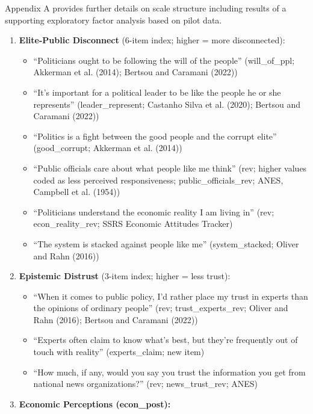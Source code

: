 \documentclass[
  12pt]{article}
\providecommand{\tightlist}{%
  \setlength{\itemsep}{0pt}\setlength{\parskip}{0pt}}
\begin{document}
Appendix A provides further details on scale structure including results
of a supporting exploratory factor analysis based on pilot data.

\begin{enumerate}
\def\labelenumi{\arabic{enumi}.}
\tightlist
\item
  \textbf{Elite-Public Disconnect} (6-item index; higher = more
  disconnected):

  \begin{itemize}
  \tightlist
  \item
    ``Politicians ought to be following the will of the people''
    (will\_of\_ppl; Akkerman et al. (2014); Bertsou and Caramani (2022))
  \item
    ``It's important for a political leader to be like the people he or
    she represents'' (leader\_represent; Castanho Silva et al. (2020);
    Bertsou and Caramani (2022))
  \item
    ``Politics is a fight between the good people and the corrupt
    elite'' (good\_corrupt; Akkerman et al. (2014))
  \item
    ``Public officials care about what people like me think'' (rev;
    higher values coded as less perceived responsiveness;
    public\_officials\_rev; ANES, Campbell et al. (1954))
  \item
    ``Politicians understand the economic reality I am living in'' (rev;
    econ\_reality\_rev; SSRS Economic Attitudes Tracker)
  \item
    ``The system is stacked against people like me'' (system\_stacked;
    Oliver and Rahn (2016))
  \end{itemize}
\item
  \textbf{Epistemic Distrust} (3-item index; higher = less trust):

  \begin{itemize}
  \tightlist
  \item
    ``When it comes to public policy, I'd rather place my trust in
    experts than the opinions of ordinary people'' (rev;
    trust\_experts\_rev; Oliver and Rahn (2016); Bertsou and Caramani
    (2022))
  \item
    ``Experts often claim to know what's best, but they're frequently
    out of touch with reality'' (experts\_claim; new item)
  \item
    ``How much, if any, would you say you trust the information you get
    from national news organizations?'' (rev; news\_trust\_rev; ANES)
  \end{itemize}
\item
  \textbf{Economic Perceptions (econ\_post):}


\end{enumerate}
\end{document}
